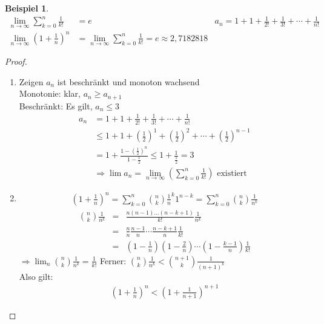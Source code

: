 \documentclass[ngerman,titlepage,twoside, parskip=half*]{scrreprt}
\theoremstyle{break}
\theoremstyle{nonumberbreak}
\newtheorem{beispiel}{Beispiel}
\newtheorem{proof}{Beweis:}
\begin{document}
\begin{beispiel}
\begin{align*}
  \lim_{n \rightarrow \infty} \sum_{k=0}^n \frac{1}{k!} &= e & a_n=
  1+1+\frac{1}{2!}+\frac{1}{3!}+\cdots + \frac{1}{n!}\\
  \lim_{n \rightarrow \infty} \left(1+\frac{1}{n}\right)^n &= \lim_{n \rightarrow
    \infty} \sum_{k=0}^n \frac{1}{k!}=e\approx2,7182818
\end{align*}
\end{beispiel}
\begin{proof}
\begin{enumerate}
  \item Zeigen $a_n$ ist beschränkt und monoton wachsend\\
    Monotonie: klar, $a_n \geq a_{n+1}$\\
    Beschränkt: Es gilt, $a_n \leq 3$
    \begin{align*}
      a_n& = 1+1+\frac{1}{2!}+\frac{1}{3!}+\cdots + \frac{1}{n!}\\
      & \leq 1+ 1+ \left(\frac{1}{2}\right)^1
      +\left(\frac{1}{2}\right)^2 +\cdots + \left( \frac{1}{2} \right)^{n-1}\\
      & = 1+ \frac{1-\left(\frac{1}{2}\right)^n}{1-\frac{1}{2}} \leq
      1+\frac{1}{\frac{1}{2}} = 3\\
      &\Rightarrow \lim a_n = \lim_{n \rightarrow \infty}
      \left(\sum_{k=0}^n \frac{1}{k!}\right) \text{ existiert}
  \end{align*}
  \item \begin{gather*}\left(1+\frac{1}{n}\right)^n = \sum_{k=0}^n \binom{n}{k}\frac{1}{n}^k
    1^{n-k} = \sum_{k=0}^n \binom{n}{k} \frac{1}{n^k}\end{gather*}
    \begin{align*}
    \binom{n}{k} \frac{1}{n^k} & = & \frac{n(n-1)\ldots(n-k+1)}{k!}\frac{1}{n^k}\\
    & = & \frac{n}{n} \frac{n-1}{n} \cdots \frac{n-k+1}{n} \frac{1}{k!}\\
    & = & \left(1-\frac{1}{n}\right)\left(1-\frac{2}{n}\right) \cdots \left(1-
    \frac{k-1}{n}\right) \frac{1}{k!}
    \end{align*}
    $\Rightarrow \lim_n \binom{n}{k} \frac{1}{n^k}=\frac{1}{k!}$ Ferner:
    $\binom{n}{k} \frac{1}{n^k} < \binom{n+1}{k} \frac{1}{(n+1)^k}$\\
    Also gilt: \begin{gather*}\left(1+\frac{1}{n}\right)^n<\left(1+\frac{1}{n+1}\right)^{n+1}

\end{gather*}
\end{enumerate}
\end{proof}
\end{document}
